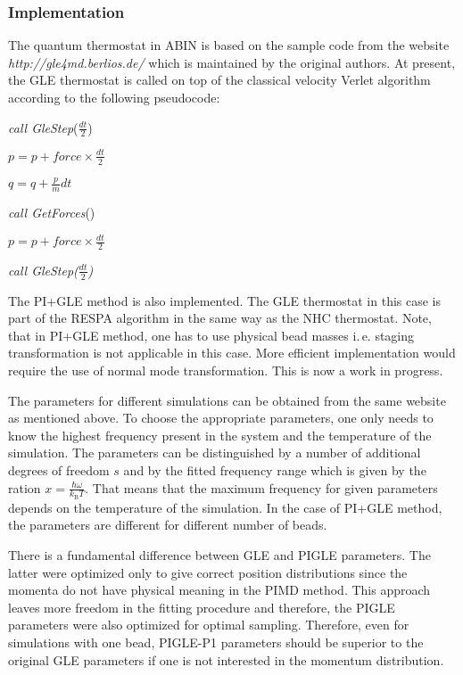 \subsubsection{Implementation}
\label{sGLEimpl}
The quantum thermostat in \textsc{ABIN} is based on the sample code from the website \textit{http://gle4md.berlios.de/} which is maintained by the original authors.
At present, the GLE thermostat is called on top of the classical velocity Verlet algorithm according to the following pseudocode:
\vspace*{0.4cm}

\textit{call GleStep}($\frac{dt}{2}$)

$p = p + force\times\frac{dt}{2} $

$q = q + \frac{p}{m}dt $

\textit{call GetForces}() 

$p = p + force\times\frac{dt}{2} $

\textit{call GleStep($\frac{dt}{2}$)}
\vspace*{0.4cm}

The PI+GLE method is also implemented. The GLE thermostat in this case is part of the RESPA algorithm in the same way as the NHC thermostat. Note, that in PI+GLE method, one has to use physical bead masses i.\,e. staging transformation is not applicable in this case\cite{Ceriotti2012}. More efficient implementation would require the use of normal mode transformation. This is now a work in progress.

The parameters for different simulations can be obtained from the same website as mentioned above. To choose the appropriate parameters, one only needs to know the highest frequency present in the system and the temperature of the simulation. The parameters can be distinguished by a number of additional degrees of freedom $s$ and by the fitted frequency range which is given by the ration $x=\frac{\hbar\omega}{k_\mathrm{B}T}$. That means that the maximum frequency for given parameters depends on the temperature of the simulation. In the case of PI+GLE method, the parameters are different for different number of beads.

There is a fundamental difference between GLE and PIGLE parameters. The latter were optimized only to give correct position distributions since the momenta do not have physical meaning in the PIMD method. This approach leaves more freedom in the fitting procedure and therefore, the PIGLE parameters were also optimized for optimal sampling. Therefore, even for simulations with one bead, PIGLE-P1 parameters should be superior to the original GLE parameters if one is not interested in the momentum distribution. 


